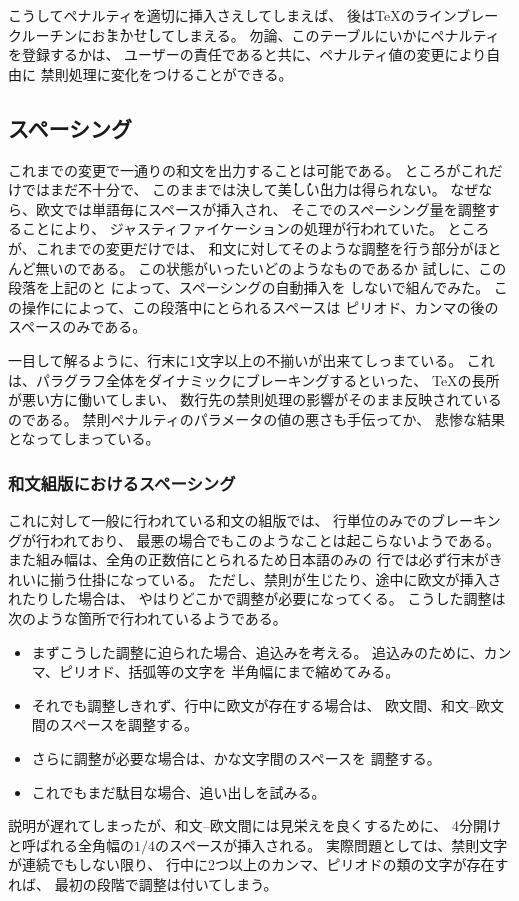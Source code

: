 こうしてペナルティを適切に挿入さえしてしまえば、
後は\TeX のラインブレークルーチンに\. お\. ま\. か\. せしてしまえる。
勿論、このテーブルにいかにペナルティを登録するかは、
ユーザーの責任であると共に、ペナルティ値の変更により自由に
禁則処理に変化をつけることができる。
%
\subsection{スペーシング}
{\noautospacing\noautoxspacing
これまでの変更で一通りの和文を出力することは可能である。
ところがこれだけではまだ不十分で、
このままでは決して\. 美\. し\. い出力は得られない。
なぜなら、欧文では単語毎にスペースが挿入され、
そこでのスペーシング量を調整することにより、
ジャスティファイケーションの処理が行われていた。
ところが、これまでの変更だけでは、
和文に対してそのような調整を行う部分がほとんど無いのである。
この状態がいったいどのようなものであるか
試しに、この段落を上記の{\it{}}と
{\it{}}によって、スペーシングの自動挿入を
しないで組んでみた。
この操作にによって、この段落中にとられるスペースは
ピリオド、カンマの後のスペースのみである。\par}

一目して解るように、行末に1文字以上の不揃いが出来てしっまている。
これは、パラグラフ全体をダイナミックにブレーキングするといった、
\TeX の長所が悪い方に働いてしまい、
数行先の禁則処理の影響がそのまま反映されているのである。
禁則ペナルティのパラメータの値の悪さも手伝ってか、
悲惨な結果となってしまっている。
%
\subsubsection{和文組版におけるスペーシング}
これに対して一般に行われている和文の組版では、
行単位のみでのブレーキングが行われており、
最悪の場合でもこのようなことは起こらないようである。
また組み幅は、全角の正数倍にとられるため日本語のみの
行では必ず行末がきれいに揃う仕掛になっている。
ただし、禁則が生じたり、途中に欧文が挿入されたりした場合は、
やはりどこかで調整が必要になってくる。
こうした調整は次のような箇所で行われているようである。
\begin{itemize}
\item まずこうした調整に迫られた場合、追込みを考える。
	追込みのために、カンマ、ピリオド、括弧等の文字を
	半角幅にまで縮めてみる。
\item それでも調整しきれず、行中に欧文が存在する場合は、
	欧文間、和文--欧文間のスペースを調整する。
\item さらに調整が必要な場合は、かな文字間のスペースを
	調整する。
\item これでもまだ駄目な場合、追い出しを試みる。
\end{itemize}
説明が遅れてしまったが、和文--欧文間には見栄えを良くするために、
4分開けと呼ばれる全角幅の$1/4$のスペースが挿入される。
実際問題としては、禁則文字が連続でもしない限り、
行中に2つ以上のカンマ、ピリオドの類の文字が存在すれば、
最初の段階で調整は付いてしまう。

